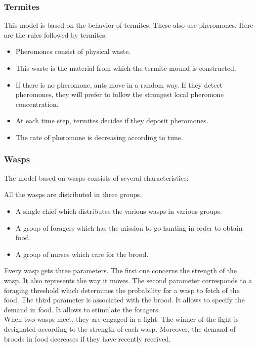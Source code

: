 \newpage

\subsubsection{Termites}

This model is based on the behavior of termites. These also use pheromones. Here are the rules followed by termites:

\begin{itemize}
\item Pheromones consist of physical waste.
\item This waste is the material from which the termite mound is constructed.
\item If there is no pheromone, ants move in a random way. If they detect pheromones, they will prefer to follow the strongest local pheromone concentration.
\item At each time step, termites decides if they deposit pheromones.
\item The rate of pheromone is decreasing according to time.
\end{itemize} 

\newpage

\subsubsection{Wasps}

The model based on wasps consists of several characteristics:

All the wasps are distributed in three groups.
\begin{itemize}
\item A single chief which distributes the various wasps in various groups.
\item A group of foragers which has the mission to go hunting in order to obtain food.
\item A group of nurses which care for the brood.
\end{itemize}

Every wasp gets three parameters. The first one concerns the strength of the wasp. It also represents the way it moves. The second parameter corresponds to a foraging threshold which determines the probability for a wasp to fetch of the food. The third parameter is associated with the brood. It allows to specify the demand in food. It allows to stimulate the foragers.\\
When two wasps meet, they are engaged in a fight.
The winner of the fight is designated according to the strength of each wasp. Moreover, the demand of broods in food decreases if they have recently received.

